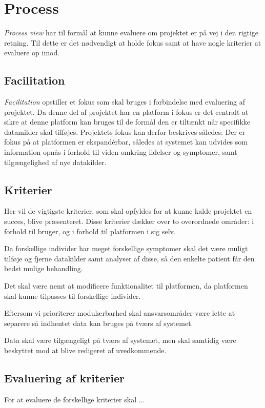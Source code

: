 \section{Process}\label{sec:process}
\emph{Process view} har til formål at kunne evaluere om projektet er på vej i den rigtige retning. 
Til dette er det nødvendigt at holde fokus samt at have nogle kriterier at evaluere op imod.

\subsection{Facilitation}
\emph{Facilitation} opstiller et fokus som skal bruges i forbindelse med evaluering af projektet.
Da denne del af projektet har en platform i fokus er det centralt at sikre at denne platform kan bruges til de formål den er tiltænkt når specifikke datamilder skal tilføjes.
Projektets fokus kan derfor beskrives således:
Der er fokus på at platformen er ekspandérbar, således at systemet kan udvides som information opnås i forhold til viden omkring lidelser og symptomer, samt tilgængelighed af nye datakilder.

\subsection{Kriterier}\label{firstsubseckriterier}
Her vil de vigtigste kriterier, som skal opfyldes for at kunne kalde projektet en succes, blive præsenteret.
Disse kriterier dækker over to overordnede områder: i forhold til bruger, og i forhold til platformen i sig selv.

\begin{description}[style=nextline]
	\item[Modulær] 
	Da forskellige individer har meget forskellige symptomer skal det være muligt tilføje og fjerne datakilder samt analyser af disse, så den enkelte patient får den bedst mulige behandling.
	\item[Fleksibilitet]
	Det skal være nemt at modificere funktionalitet til platformen, da platformen skal kunne tilpasses til forskellige individer.
	\item[Kombinerbar] Eftersom vi prioriterer modulærbarhed skal ansvarsområder være lette at separere så indhentet data kan bruges på tværs af systemet.
	\item[Kommunikation] Data skal være tilgængeligt på tværs af systemet, men skal samtidig være beskyttet mod at blive redigeret af uvedkommende.
\end{description}

\subsection{Evaluering af kriterier}
For at evaluere de forskellige kriterier skal ...



